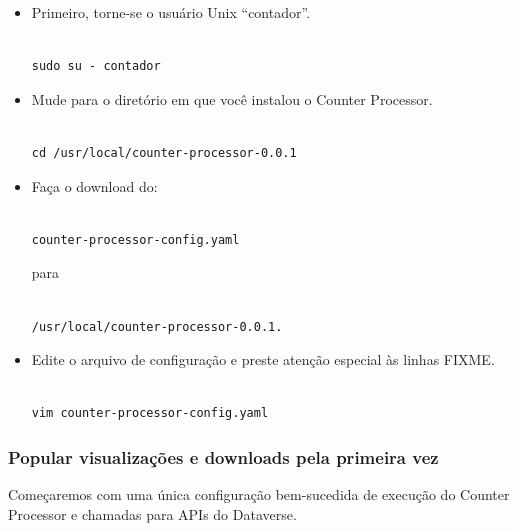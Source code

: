 \documentclass[12pt,hidelinks]{article}
\begin{document}
\begin{itemize}
    
\item Primeiro, torne-se o usuário Unix “contador”.

\begin{verbatim}

sudo su - contador

\end{verbatim}

\item Mude para o diretório em que você instalou o Counter Processor.

\begin{verbatim}

cd /usr/local/counter-processor-0.0.1

\end{verbatim}

\item Faça o download do:

\begin{verbatim}

counter-processor-config.yaml 

\end{verbatim}

para 

\begin{verbatim}

/usr/local/counter-processor-0.0.1.

\end{verbatim}

\item Edite o arquivo de configuração e preste atenção especial às linhas FIXME.

\begin{verbatim}

vim counter-processor-config.yaml

\end{verbatim}

\end{itemize}

\subsubsection{Popular visualizações e downloads pela primeira vez}

\qquad Começaremos com uma única configuração bem-sucedida de execução do Counter Processor e chamadas para APIs do Dataverse.
\end{document}
